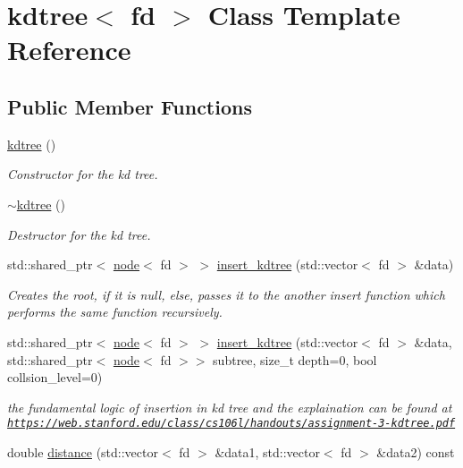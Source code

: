 \hypertarget{classkdtree}{}\section{kdtree$<$ fd $>$ Class Template Reference}
\label{classkdtree}
\subsection*{Public Member Functions}
\begin{DoxyCompactItemize}
\item 
\hyperlink{classkdtree_a938fa159f9e1088db61c8fc34b2d31c9}{kdtree} ()
\begin{DoxyCompactList}\small\item\em Constructor for the kd tree. \end{DoxyCompactList}\item 
\hyperlink{classkdtree_aed5e97fa78a51ce22c83874f5ccfc91a}{$\sim$kdtree} ()
\begin{DoxyCompactList}\small\item\em Destructor for the kd tree. \end{DoxyCompactList}\item 
std\+::shared\+\_\+ptr$<$ \hyperlink{classnode}{node}$<$ fd $>$ $>$ \hyperlink{classkdtree_a42af3021231ec8fceff78d6f309d2571}{insert\+\_\+kdtree} (std\+::vector$<$ fd $>$ \&data)
\begin{DoxyCompactList}\small\item\em Creates the root, if it is null, else, passes it to the another insert function which performs the same function recursively. \end{DoxyCompactList}\item 
std\+::shared\+\_\+ptr$<$ \hyperlink{classnode}{node}$<$ fd $>$ $>$ \hyperlink{classkdtree_a6ecd469b21764e96fd222835bef0ed0c}{insert\+\_\+kdtree} (std\+::vector$<$ fd $>$ \&data, std\+::shared\+\_\+ptr$<$ \hyperlink{classnode}{node}$<$ fd $>$$>$ subtree, size\+\_\+t depth=0, bool collsion\+\_\+level=0)
\begin{DoxyCompactList}\small\item\em the fundamental logic of insertion in kd tree and the explaination can be found at \href{https://web.stanford.edu/class/cs106l/handouts/assignment-3-kdtree.pdf}{\tt https\+://web.\+stanford.\+edu/class/cs106l/handouts/assignment-\/3-\/kdtree.\+pdf} \end{DoxyCompactList}\item 
double \hyperlink{classkdtree_a9c74e7b92f12990844c7c5ec9e840c2f}{distance} (std\+::vector$<$ fd $>$ \&data1, std\+::vector$<$ fd $>$ \&data2) const
$$
\end{DoxyCompactItemize}
